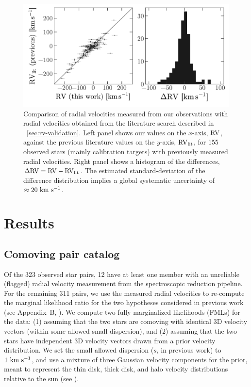 \documentclass[modern, letterpaper]{aastex61}
\begin{document}
\begin{figure}[!ht]
  \begin{center}
    \includegraphics[width=0.85\linewidth]{rv-comparison.pdf}
  \end{center}
  \caption{%
    Comparison of radial velocities measured from our observations with radial
    velocities obtained from the literature search described in
    \sectionname~\ref{sec:rv-validation}.
    Left panel shows our values on the $x$-axis, ${\rm RV}$, against the
    previous literature values on the $y$-axis, ${\rm RV}_{\rm lit}$, for 155
    observed stars (mainly calibration targets) with previously measured radial
    velocities.
    Right panel shows a histogram of the differences, $\Delta{\rm RV} = {\rm RV}
    - {\rm RV}_{\rm lit}$.
    The estimated standard-deviation of the difference distribution implies a
    global systematic uncertainty of $\approx 20~\mathrm{km}~\mathrm{s}^{-1}$.
    \label{fig:compare-previous}}
\end{figure}

\section{Results} \label{sec:results}

\subsection{Comoving pair catalog}\label{sec:catalog}

Of the 323 observed star pairs, 12 have at least one member with an unreliable
(flagged) radial velocity measurement from the spectroscopic reduction pipeline.
For the remaining 311 pairs, we use the measured radial velocities to re-compute
the marginal likelihood ratio for the two hypotheses considered in previous work
(see Appendix~B, \citealt{Oh:2017}).
We compute two fully marginalized likelihoods (FMLs) for the data: (1) assuming
that the two stars are comoving with identical 3D velocity vectors (within some
allowed small dispersion), and (2) assuming that the two stars have independent
3D velocity vectors drawn from a prior velocity distribution.
We set the small allowed dispersion ($s$, in previous work) to $1~\mathrm{km}~\mathrm{s}^{-1}$, and use
a mixture of three Gaussian velocity components for the prior, meant to
represent the thin disk, thick disk, and halo velocity distributions relative to
the sun (see \citealt{Oh:2017}).
\end{document}
